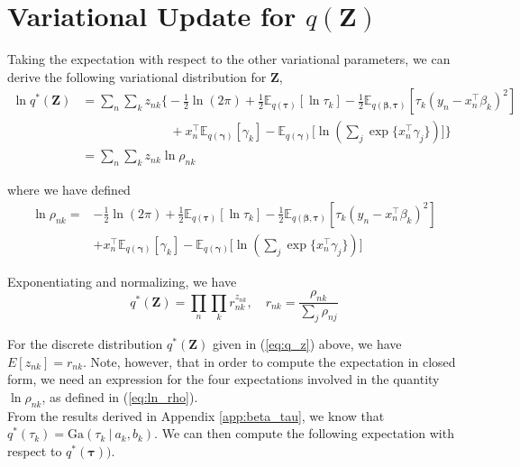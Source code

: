 \documentclass[twoside,11pt]{article}
\newcommand{\tr}{\intercal}
\newcommand\given[1][]{\:#1\vert\:}
\newcommand{\E}{\mathbb{E}}
\begin{document}
\newpage

\appendix
\section{Variational Update for $q(\mathbf{Z})$} 
\label{app:q_z}

Taking the expectation with respect to the other variational parameters, we can derive the following variational distribution for $\mathbf{Z}$,
\begin{align*}
	\ln q^{*}(\mathbf{Z}) &= \sum_n \sum_k z_{nk} \Bigg\{  -\frac{1}{2}\ln(2\pi) + \frac{1}{2} \E_{q(\boldsymbol\tau)}[ \ln \tau_k ] - \frac{1}{2} \E_{q(\boldsymbol\beta, \boldsymbol\tau)}[\tau_k (y_n - x_n^{\tr}\beta_k)^2] \\ 
	&\qquad \qquad \qquad \quad + x_n^{\tr}\E_{q(\boldsymbol\gamma)}[\gamma_k] - \E_{q(\boldsymbol\gamma)}\Bigg[\ln ( \sum_{j} \exp \{ x_n^{\tr} \gamma_j \})\Bigg]\Bigg\} \\
	&= \sum_n \sum_k z_{nk} \ln \rho_{nk}
\end{align*}

where we have defined 
\begin{equation} \label{eq:ln_rho}
\begin{split}
 \ln \rho_{nk} = &-\frac{1}{2}\ln(2\pi) + \frac{1}{2} \E_{q(\boldsymbol\tau)}[ \ln \tau_k ] - \frac{1}{2} \E_{q(\boldsymbol\beta, \boldsymbol\tau)}[\tau_k (y_n - x_n^{\tr}\beta_k)^2] \\ 
	& + x_n^{\tr}\E_{q(\boldsymbol\gamma)}[\gamma_k] - \E_{q(\boldsymbol\gamma)}\Bigg[\ln \left( \sum_{j} \exp \{ x_n^{\tr} \gamma_j \}\right)\Bigg]
\end{split}
\end{equation}


Exponentiating and normalizing, we have
\begin{equation} \label{eq:q_z}
	q^{*}(\mathbf{Z}) = \prod_{n} \prod_{k} r_{nk}^{z_{nk}}, \quad r_{nk} = \frac{\rho_{nk}}{\sum_{j} \rho_{nj}}
\end{equation}

For the discrete distribution $q^{*}(\mathbf{Z})$ given in (\ref{eq:q_z}) above, we have $E[z_{nk}] = r_{nk}$. Note, however, that in order to compute the expectation in closed form, we need an expression for the four expectations involved in the quantity $\ln \rho_{nk}$, as defined in (\ref{eq:ln_rho}). \\

From the results derived in Appendix \ref{app:beta_tau}, we know that $q^{*}(\tau_k) = \mathrm{Ga}(\tau_k \given a_k, b_k)$. We can then compute the following expectation with respect to $q^{*}(\boldsymbol\tau))$.
\end{document}
